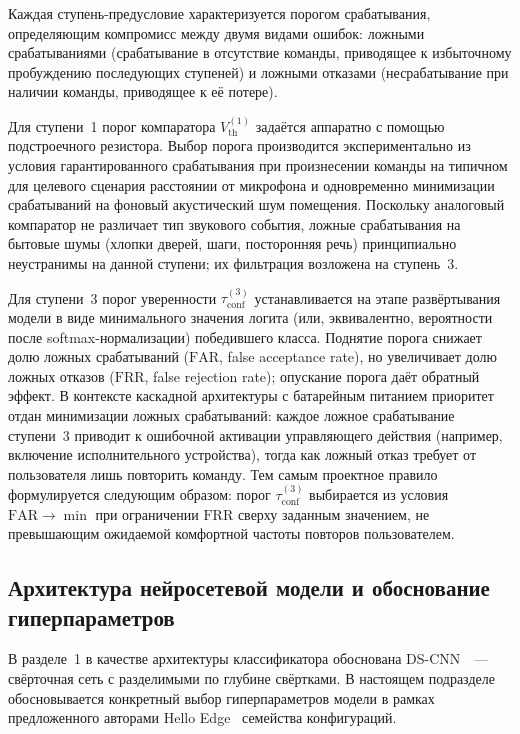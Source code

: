 Каждая ступень-предусловие характеризуется порогом срабатывания,
определяющим компромисс между двумя видами ошибок: ложными
срабатываниями (срабатывание в отсутствие команды, приводящее к
избыточному пробуждению последующих ступеней) и ложными отказами
(несрабатывание при наличии команды, приводящее к её потере).

Для ступени~1 порог компаратора $V_{\mathrm{th}}^{(1)}$ задаётся
аппаратно с помощью подстроечного резистора. Выбор порога производится
экспериментально из условия гарантированного срабатывания при
произнесении команды на типичном для целевого сценария расстоянии от
микрофона и одновременно минимизации срабатываний на фоновый
акустический шум помещения. Поскольку аналоговый компаратор не различает
тип звукового события, ложные срабатывания на бытовые шумы (хлопки
дверей, шаги, посторонняя речь) принципиально неустранимы на данной
ступени; их фильтрация возложена на ступень~3.

Для ступени~3 порог уверенности $\tau_{\mathrm{conf}}^{(3)}$
устанавливается на этапе развёртывания модели в виде минимального
значения логита (или, эквивалентно, вероятности после
softmax-нормализации) победившего класса. Поднятие порога снижает долю
ложных срабатываний ($\mathrm{FAR}$, false acceptance rate), но
увеличивает долю ложных отказов ($\mathrm{FRR}$, false rejection rate);
опускание порога даёт обратный эффект. В контексте каскадной архитектуры
с батарейным питанием приоритет отдан минимизации ложных срабатываний:
каждое ложное срабатывание ступени~3 приводит к ошибочной активации
управляющего действия (например, включение исполнительного устройства),
тогда как ложный отказ требует от пользователя лишь повторить команду.
Тем самым проектное правило формулируется следующим образом: порог
$\tau_{\mathrm{conf}}^{(3)}$ выбирается из условия $\mathrm{FAR} \to
	\min$ при ограничении $\mathrm{FRR}$ сверху заданным значением, не
превышающим ожидаемой комфортной частоты повторов пользователем.

\subsection{Архитектура нейросетевой модели и обоснование гиперпараметров}

В разделе~1 в качестве архитектуры классификатора обоснована
DS-CNN~\cite{src:1}~--- свёрточная сеть с разделимыми по глубине
свёртками. В настоящем подразделе обосновывается конкретный выбор
гиперпараметров модели в рамках предложенного авторами Hello
Edge~\cite{src:1} семейства конфигураций.

